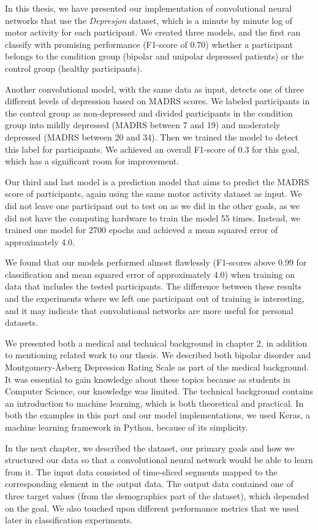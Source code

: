 In this thesis, we have presented our implementation of convolutional neural networks that use the \textit{Depresjon} dataset, which is a minute by minute log of motor activity for each participant. We created three models, and the first can classify with promising performance (F1-score of 0.70) whether a participant belongs to the condition group (bipolar and unipolar depressed patients) or the control group (healthy participants). 

Another convolutional model, with the same data as input, detects one of three different levels of depression based on MADRS scores. We labeled participants in the control group as non-depressed and divided participants in the condition group into mildly depressed (MADRS between 7 and 19) and moderately depressed (MADRS between 20 and 34). Then we trained the model to detect this label for participants. We achieved an overall F1-score of 0.3 for this goal, which has a significant room for improvement.  

Our third and last model is a prediction model that aims to predict the MADRS score of participants, again using the same motor activity dataset as input. We did not leave one participant out to test on as we did in the other goals, as we did not have the computing hardware to train the model 55 times. Instead, we trained one model for 2700 epochs and achieved a mean squared error of approximately 4.0. 

We found that our models performed almost flawlessly (F1-scores above 0.99 for classification and mean squared error of approximately 4.0) when training on data that includes the tested participants. The difference between these results and the experiments where we left one participant out of training is interesting, and it may indicate that convolutional networks are more useful for personal datasets. 

We presented both a medical and technical background in chapter 2, in addition to mentioning related work to our thesis. We described both bipolar disorder and Montgomery-Åsberg Depression Rating Scale as part of the medical background. It was essential to gain knowledge about these topics because as students in Computer Science, our knowledge was limited. The technical background contains an introduction to machine learning, which is both theoretical and practical. In both the examples in this part and our model implementations, we used Keras, a machine learning framework in Python, because of its simplicity. 

In the next chapter, we described the dataset, our primary goals and how we structured our data so that a convolutional neural network would be able to learn from it. The input data consisted of time-sliced segments mapped to the corresponding element in the output data. The output data contained one of three target values (from the demographics part of the dataset), which depended on the goal. We also touched upon different performance metrics that we used later in classification experiments.

